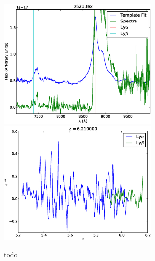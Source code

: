 \documentclass[11pt]{article}
\begin{document}
\begin{figure}[h]
  \includegraphics[width=8cm]{z621.eps}
  \includegraphics[width=8cm]{z621_Transmission.eps}
  \caption{todo}
  \label{fig:todo}
\end{figure}
\end{document}
